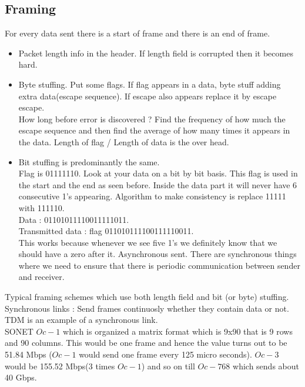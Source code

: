 \documentclass[solution,addpoints,12pt]{exam}
\begin{document}
\subsection{Framing}
For every data sent there is a start of frame and there is an end of frame.
\begin{itemize}
\item Packet length info in the header. If length field is
corrupted then it becomes hard.
\item Byte stuffing. Put some flags. If flag appears
in a data, byte stuff adding extra data(escape sequence).
If escape also appears replace it by escape escape.\\
How long before error is discovered ? Find the frequency
of how much the escape sequence and then find the
average of how many times it appears in the data.
Length of flag / Length of data is the over head.
\item Bit stuffing is predominantly the same.\\
Flag is 01111110. Look at your data on a bit by bit basis.
This flag is used in the start and the end as seen before.
Inside the data part it will never have 6 consecutive 1's
appearing. Algorithm to make consistency is
replace 11111 with 111110.\\
Data : 01101011110011111011.\\
Transmitted data : flag 011010111100111110011.\\
This works because whenever we see five 1's we definitely
know that we should have a zero after it. Asynchronous
sent. There are synchronous things where we need to ensure
that there is periodic communication between sender and receiver.
\end{itemize}
Typical framing schemes which use both length field and
bit (or byte) stuffing.\\
Synchronous links : Send frames continuosly whether they contain
data or not. TDM is an example of a synchronous link.\\
SONET $Oc-1$ which is organized a matrix format which is 9x90
that is 9 rows and 90 columns. This would be one frame and hence
the value turns out to be 51.84 Mbps ($Oc-1$ would send one frame
every 125 micro seconds). $Oc-3$ would be 155.52 Mbps(3 times $Oc-1$)
and so on till $Oc-768$ which sends about 40 Gbps.
\end{document}
